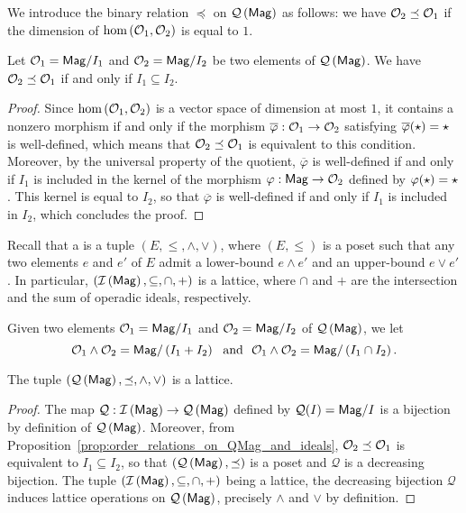 We introduce the binary relation $\preceq$ on $\mathcal{Q}\left(\mathsf{Mag}\right)$ as follows: we
have $\mathcal{O}_2\preceq\mathcal{O}_1$ if the dimension of
$\text{hom}\left(\mathcal{O}_1,\mathcal{O}_2\right)$ is equal to $1$.

\begin{Proposition} \label{prop:order_relations_on_QMag_and_ideals}
  Let $\mathcal{O}_1=\mathsf{Mag}/I_1$ and $\mathcal{O}_2=\mathsf{Mag}/I_2$ be two elements of $\mathcal{Q}\left(\mathsf{Mag}\right)$.
  We have $\mathcal{O}_2\preceq\mathcal{O}_1$ if and only if $I_1\subseteq I_2$.
\end{Proposition}

\begin{proof}
  Since $\text{hom}\left(\mathcal{O}_1,\mathcal{O}_2\right)$ is a vector space of
  dimension at most $1$, it contains a nonzero morphism if and only if
  the morphism
  $\overline{\varphi}:\mathcal{O}_1\to\mathcal{O}_2$ satisfying
  $\overline{\varphi}(\operatorname{\star})=\operatorname{\star}$ is well-defined, which means
  that $\mathcal{O}_2\preceq\mathcal{O}_1$ is equivalent to this condition. Moreover,
  by the universal property of the quotient, $\overline{\varphi}$ is
  well-defined if and only if $I_1$ is included in the kernel of the
  morphism $\varphi:\mathsf{Mag}\to\mathcal{O}_2$ defined by
  $\varphi(\operatorname{\star})=\operatorname{\star}$. This kernel is equal to $I_2$, so that
  $\overline{\varphi}$ is well-defined if and only if $I_1$ is included
  in $I_2$, which concludes the proof.
\end{proof}

Recall that a  is a tuple $\left(E,\leq,\wedge,\vee\right)$,
where $\left(E,\leq\right)$ is a poset such that any two elements $e$
and $e'$ of $E$ admit a lower-bound $e\wedge e'$ and an upper-bound
$e\vee e'$. In particular, $\left(\mathcal{I}\left(\mathsf{Mag}\right),\subseteq,\cap,+\right)$ is a
lattice, where $\cap$ and $+$ are the intersection and the sum of
operadic ideals, respectively.

Given two elements $\mathcal{O}_1=\mathsf{Mag}/I_1$ and $\mathcal{O}_2=\mathsf{Mag}/I_2$ of $\mathcal{Q}\left(\mathsf{Mag}\right)$,
we let
\begin{equation} \label{equ:definition_of_lattice_operations_of_QMag}
  \mathcal{O}_1\wedge \mathcal{O}_2=\mathsf{Mag}/\left(I_1+I_2\right)\ \ \text{and}\ \
  \mathcal{O}_1\wedge \mathcal{O}_2=\mathsf{Mag}/\left(I_1\cap I_2\right).
  \end{equation}

\begin{Theorem} \label{thm:lattice_structure_of_QMag}
  The tuple $\left(\mathcal{Q}\left(\mathsf{Mag}\right),\preceq,\wedge,\vee\right)$ is a lattice.
\end{Theorem}

\begin{proof}
  The map $\mathcal{Q}:\mathcal{I}\left(\mathsf{Mag}\right)\to\mathcal{Q}\left(\mathsf{Mag}\right)$ defined by $\mathcal{Q}(I)=\mathsf{Mag}/I$
  is a bijection by definition of $\mathcal{Q}\left(\mathsf{Mag}\right)$. Moreover, from
  Proposition~\ref{prop:order_relations_on_QMag_and_ideals},
  $\mathcal{O}_2\preceq\mathcal{O}_1$ is equivalent to $I_1\subseteq I_2$, so that
  $\left(\mathcal{Q}\left(\mathsf{Mag}\right),\preceq\right)$ is a poset and $\mathcal{Q}$ is a
  decreasing bijection. The tuple $\left(\mathcal{I}\left(\mathsf{Mag}\right),\subseteq,\cap,+\right)$
  being a lattice, the decreasing bijection $\mathcal{Q}$ induces
  lattice operations on $\mathcal{Q}\left(\mathsf{Mag}\right)$, precisely $\wedge$ and $\vee$ by
  definition.
  \end{proof}
